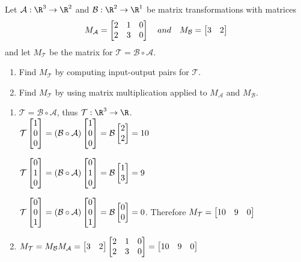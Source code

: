 \begin{exercises}
\begin{problist}
		\prob Let $\mathcal A: \R^{3}\to \R^{2}$ and $\mathcal B: \R^{2}\to \R^{1}$
		be matrix transformations with matrices
		\[
			M_{\mathcal A}= \mat{2&1&0\\2&3&0}\quad and \quad M_{\mathcal B}=
			\mat{3&2}
		\]
		 and let $M_{\mathcal T}$ be the matrix for $\mathcal T=\mathcal B\circ \mathcal
		A$.
		\begin{enumerate}
			\item Find $M_{\mathcal T}$ by computing input-output pairs for $\mathcal
				T$.

			\item Find $M_{\mathcal T}$ by using matrix multiplication applied
				to $M_{\mathcal A}$ and $M_{\mathcal B}$.
		\end{enumerate}


		\begin{solution}

			\begin{enumerate}
				\item $\mathcal T = \mathcal B \circ \mathcal A$, thus
					$\mathcal T : \R^{3}\to \R$. \\ $\mathcal T \mat{1\\0\\0}=
					(\mathcal B \circ \mathcal A) \mat{1\\0\\0}=
					\mathcal B \mat{2\\2}= 10$

					$\mathcal T \mat{0\\1\\0}= (\mathcal B \circ \mathcal
					A) \mat{0\\1\\0}= \mathcal B \mat{1\\3}= 9$

					$\mathcal T \mat{0\\0\\1}= (\mathcal B \circ \mathcal
					A) \mat{0\\0\\1}= \mathcal B \mat{0\\0}= 0$.
					Therefore $M_{\mathcal T}= \mat{10&9&0}$

				\item $M_{\mathcal T}= M_{\mathcal B}M_{\mathcal A}= \mat{3&2}\mat{2&1&0\\2&3&0}=
					\mat{10&9&0}$
			\end{enumerate}
		\end{solution}
	\end{problist}
\end{exercises}